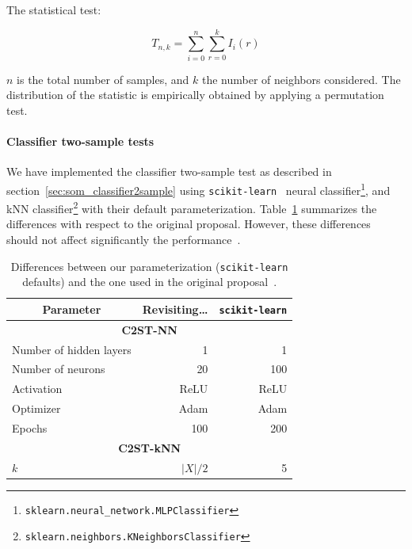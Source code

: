 The statistical test:

\begin{equation}
    T_{n,k} = \sum_{i=0}^{n}\sum_{r=0}^{k} I_i(r)
\end{equation}

$n$ is the total number of samples, and $k$ the number of neighbors considered.
The distribution of the statistic is empirically obtained by applying a permutation test.
 
\paragraph{Classifier two-sample tests}
We have implemented the classifier two-sample test as described in section~\ref{sec:som_classifier2sample}
using \texttt{scikit-learn}~\cite{scikit-learn} neural
classifier\footnote{\texttt{sklearn.neural\_network.MLPClassifier}},
and \gls{kNN} classifier\footnote{\texttt{sklearn.neighbors.KNeighborsClassifier}}
with their default parameterization. Table~\ref{tab:classifier_diff} summarizes the differences
with respect to the original proposal. However, these differences should not affect significantly
the performance~\cite{lopez2016revisiting}.

\begin{table}[htpb]
\centering
\begin{tabular}{lrr}
\multicolumn{1}{c}{\bfseries Parameter}       & \bfseries Revisiting\ldots & \texttt{scikit-learn}     \\ \hline
\multicolumn{3}{c}{\bfseries C2ST-NN} \\
Number of hidden layers &  1     &   1    \\
Number of neurons       & 20     & 100    \\
Activation              & ReLU   & ReLU   \\
Optimizer               & Adam   & Adam   \\
Epochs                  & 100    & 200    \\
\multicolumn{3}{c}{\bfseries C2ST-kNN} \\
$k$                     & $|X|/2$ & 5 \\
\end{tabular}
\caption[Differences between our parameterization]{
    Differences between our parameterization (\texttt{scikit-learn} defaults) and the one
    used in the original proposal~\cite{lopez2016revisiting}.
}
\label{tab:classifier_diff}
\end{table}

